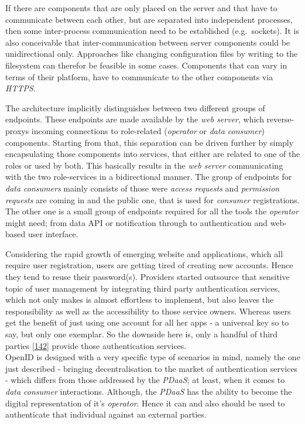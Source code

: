 \documentclass[12pt,english,a4paper,titlepage,cleardoublepage=empty,dottedtoc]{report}
\begin{document}
If there are components that are only placed on the server and that have
to communicate between each other, but are separated into independent
processes, then some inter-process communication need to be established
(e.g.~sockets). It is also conceivable that inter-communication between
server components could be unidirectional only. Approaches like changing
configuration files by writing to the filesystem can therefor be
feasible in some cases. Components that can vary in terms of their
platform, have to communicate to the other components via \emph{HTTPS}.

The architecture implicitly distinguishes between two different groups
of endpoints. These endpoints are made available by the \emph{web
server}, which reverse-proxys incoming connections to role-related
(\emph{operator} or \emph{data consumer}) components. Starting from
that, this separation can be driven further by simply encapsulating
those components into services, that either are related to one of the
roles or used by both. This basically results in the \emph{web server}
communicating with the two role-services in a bidirectional manner. The
group of endpoints for \emph{data consumers} mainly consists of those
were \emph{access requests} and \emph{permission requests} are coming in
and the public one, that is used for \emph{consumer} registrations. The
other one is a small group of endpoints required for all the tools the
\emph{operator} might need; from data API or notification through to
authentication and web-based user interface.

Considering the rapid growth of emerging website and applications, which
all require user registration, users are getting tired of creating new
accounts. Hence they tend to reuse their password(s). Providers started
outsource that sensitive topic of user management by integrating third
party authentication services, which not only makes is almost effortless
to implement, but also leaves the responsibility as well as the
accessibility to those service owners. Whereas users get the benefit of
just using one account for all her apps - a universal key so to say, but
only one exemplar. So the downside here is, only a handful of third
parties
{[}\protect\hyperlink{ref-web_2009-success-of-facebook-connect}{142}{]}
provide those authentication services.\\
OpenID is designed with a very specific type of scenarios in mind,
namely the one just described - bringing decentralisation to the market
of authentication services - which differs from those addressed by the
\emph{PDaaS}; at least, when it comes to \emph{data consumer}
interactions. Although, the \emph{PDaaS} has the ability to become the
digital representation of it's \emph{operator}. Hence it can and also
should be used to authenticate that individual against an external
parties.
\end{document}
